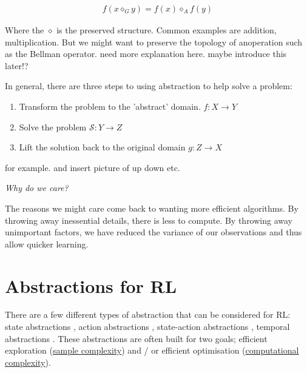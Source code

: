 \begin{align*}
f(x \diamond_G y) = f(x) \diamond_A f(y)
\end{align*}

Where the $\diamond$ is the preserved structure.
Common examples are addition, multiplication.
But we might want to preserve the topology of anoperation such as the Bellman operator.
{\color{red}need more explanation here. maybe introduce this later!?}

In general, there are three steps to using abstraction to help solve a problem:

\begin{enumerate}
\tightlist
  \item Transform the problem to the 'abstract' domain. $f: X\to Y$
  \item Solve the problem $\mathcal S: Y \to Z$
  \item Lift the solution back to the original domain  $g:Z \to X$
\end{enumerate}

{\color{red}for example. and insert picture of up down etc.}

\begin{displayquote}
 \textit{Why do we care?}
\end{displayquote}

The reasons we might care come back to wanting more efficient algorithms.
By throwing away inessential details, there is less to compute.
By throwing away unimportant factors, we have reduced the variance of our
observations and thus allow quicker learning. \footnotemark[12]

%

\section{Abstractions for RL}


There are a few different types of abstraction that can be considered for RL:
state abstractions \cite{Anand2019, Littman2006,Haarnoja,Cuccu2018,Zhonga,Vezzani2019,Abel2018,Duan2018,Abel2017,Silver2016a},
action abstractions \cite{Chandak2019,Bester2019,Tennenholtz2019,Nagabandi2019}, state-action abstractions \cite{Dayan1993,Barreto2017}, temporal abstractions \cite{Christodoulou2019, Rafati,Mankowitz2018,Harutyunyan2017,Fruit2017,Riemer2018,Bacon2018,Achiam2018,Pham2019,Konidaris2018,Haarnoja,Sutton1999,Fruit2017a,Bacon2016a,Jinnai2018,Nachum2018}.
These abstractions are often built for two goals; efficient exploration
(\href{https://en.wikipedia.org/wiki/Sample_complexity}{sample complexity})
and / or efficient optimisation (\href{https://en.wikipedia.org/wiki/Computational_complexity_theory}{computational complexity}).

